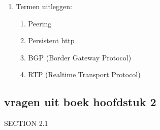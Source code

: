 \begin{enumerate}
\begin{enumerate}
\end{enumerate}

\item Termen uitleggen:

    \begin{enumerate}
         \item Peering

        \item Persistent http

        \item BGP (Border Gateway Protocol)

        \item RTP (Realtime Transport Protocol)

        \end{enumerate}
\end{enumerate}



\subsection{vragen uit boek hoofdstuk 2}

SECTION 2.1

